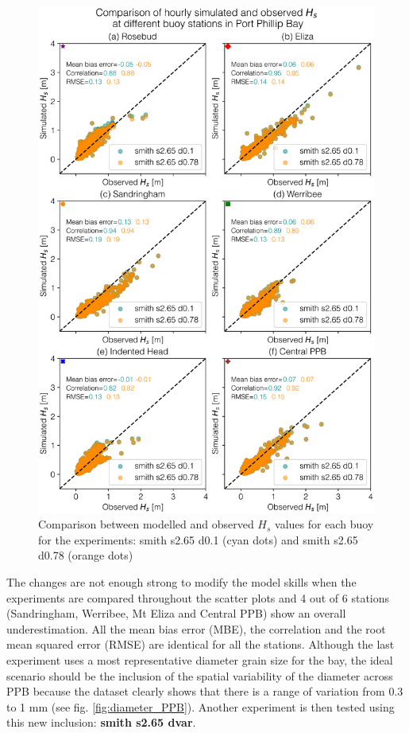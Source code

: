\documentclass[12pt]{article}
\begin{document}
\begin{figure}[H]
    \centering
    \includegraphics[scale=0.7]{plots/scatter/smith s2.65 d0.1_vs_smith s2.65 d0.78_vert_sca.png}
    \caption{Comparison between modelled and observed $H_{s}$ values for each buoy for the experiments: smith s2.65 d0.1 (cyan dots) and smith s2.65 d0.78 (orange dots)}
    \label{fig:scatter_smith_def_vs_smith_0.78}
\end{figure}

The changes are not enough strong to modify the model skills when the experiments are compared throughout the scatter plots and 4 out of 6 stations (Sandringham, Werribee, Mt Eliza and Central PPB) show an overall underestimation. All the mean bias error (MBE), the correlation and the root mean squared error (RMSE) are identical for all the stations. Although the last experiment uses a most representative diameter grain size for the bay, the ideal scenario should be the inclusion of the spatial variability of the diameter across PPB because the dataset clearly shows that there is a range of variation from 0.3 to 1 mm (see fig. \ref{fig:diameter_PPB}). Another experiment is then tested using this new inclusion: \textbf{smith s2.65 dvar}.
\end{document}

